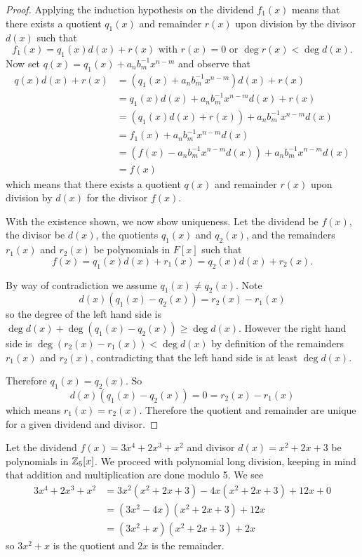 \begin{proof}
    Applying the induction hypothesis on the dividend $f_1(x)$ means that there exists a quotient $q_1(x)$ and remainder $r(x)$ upon division by the divisor $d(x)$ such that
    \[
        f_1(x) = q_1(x)d(x) + r(x) \text{ with } r(x) = 0 \text{ or } \deg r(x) < \deg d(x).
    \]
    Now set $q(x) = q_1(x) + a_nb_m^{-1}x^{n-m}$ and observe that
    \begin{align*}
        q(x)d(x) + r(x) &= (q_1(x) + a_nb_m^{-1}x^{n-m})d(x) + r(x)\\
        &= q_1(x)d(x) + a_nb_m^{-1}x^{n-m}d(x) + r(x)\\
        &= (q_1(x)d(x) + r(x)) + a_nb_m^{-1}x^{n-m}d(x)\\
        &= f_1(x) + a_nb_m^{-1}x^{n-m}d(x)\\
        &= (f(x) - a_nb_m^{-1}x^{n-m}d(x)) + a_nb_m^{-1}x^{n-m}d(x)\\
        &= f(x)
    \end{align*}
    which means that there exists a quotient $q(x)$ and remainder $r(x)$ upon division by $d(x)$ for the divisor $f(x)$.

    With the existence shown, we now show uniqueness. Let the dividend be $f(x)$, the divisor be $d(x)$, the quotients $q_1(x)$ and $q_2(x)$, and the remainders $r_1(x)$ and $r_2(x)$ be polynomials in $F[x]$ such that
    \[
        f(x) = q_1(x)d(x) + r_1(x) = q_2(x)d(x) + r_2(x).
    \]
    
    By way of contradiction we assume $q_1(x) \neq q_2(x)$. Note
    \[
        d(x)(q_1(x) - q_2(x)) = r_2(x) - r_1(x)
    \]
    so the degree of the left hand side is $\deg d(x) + \deg(q_1(x) - q_2(x)) \geq \deg d(x)$. However the right hand side is $\deg(r_2(x) - r_1(x)) < \deg d(x)$ by definition of the remainders $r_1(x)$ and $r_2(x)$, contradicting that the left hand side is at least $\deg d(x)$.

    Therefore $q_1(x) = q_2(x)$. So
    \[
        d(x)(q_1(x) - q_2(x)) = 0 = r_2(x) - r_1(x)
    \]
    which means $r_1(x) = r_2(x)$. Therefore the quotient and remainder are unique for a given dividend and divisor.
\end{proof}

\begin{example}
    Let the dividend $f(x) = 3x^4 + 2x^3 + x^2$ and divisor $d(x) = x^2 + 2x + 3$ be polynomials in $\mathbb{Z}_5[x]$. We proceed with polynomial long division, keeping in mind that addition and multiplication are done modulo 5. We see
    \begin{align*}
        3x^4 + 2x^3 + x^2 &= 3x^2(x^2 + 2x + 3) - 4x(x^2 + 2x + 3) + 12x + 0\\
        &= (3x^2-4x)(x^2+2x+3) + 12x\\
        &= (3x^2+x)(x^2+2x+3) + 2x
    \end{align*}
    so $3x^2+x$ is the quotient and $2x$ is the remainder.
\end{example}

